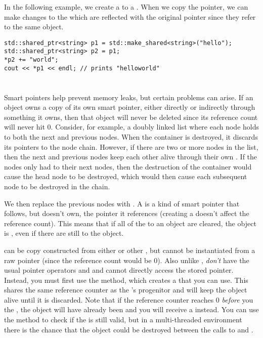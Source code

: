In the following example, we create a \sharedptr to a \stringtype.
When we copy the pointer, we can make changes to the \stringtype which are reflected with the original pointer since they refer to the same object.

\begin{lstlisting}
std::shared_ptr<string> p1 = std::make_shared<string>("hello");
std::shared_ptr<string> p2 = p1;
*p2 += "world";
cout << *p1 << endl; // prints "helloworld"
\end{lstlisting}


\section{\weakptr}\label{ch:WeakPtr}

Smart pointers help prevent memory leaks, but certain problems can arise.
If an object owns a copy of its own smart pointer, either directly or indirectly through something it owns, then that object will never be deleted since its reference count will never hit 0.
Consider, for example, a doubly linked list where each node holds \sharedptrs to both the next and previous nodes.
When the container is destroyed, it discards its pointers to the node chain.
However, if there are two or more nodes in the list, then the next and previous nodes keep each other alive through their own \sharedptrs.
If the nodes only had \sharedptrs to their next nodes, then the destruction of the container would cause the head node to be destroyed,
which would then cause each subsequent node to be destroyed in the chain.

We then replace the previous nodes with \weakptrs.
A \weakptr is a kind of smart pointer that follows, but doesn't own, the pointer it references (creating a \weakptr doesn't affect the reference count).
This means that if all of the \sharedptrs to an object are cleared, the object is \deleted, even if there are still \weakptrs to the object.

\weakptrs can be copy constructed from either \sharedptrs or other \weakptrs, but cannot be instantiated from a raw pointer (since the reference count would be 0).
Also unlike \sharedptrs, \weakptrs \emph{don't} have the usual pointer operators \code{*} and \code{->} and cannot directly access the stored pointer.
Instead, you must first use the  method, which creates a \sharedptr that you can use.
This \sharedptr shares the same reference counter as the \weakptr's progenitor and will keep the object alive until it is discarded.
Note that if the reference counter reaches 0 \emph{before} you  the \weakptr, the object will have already been \deleted and you will receive a  \sharedptr instead.
You can use the  method to check if the \weakptr is still valid, but in a multi-threaded environment there is the chance that the object could be destroyed between the calls to  and .


